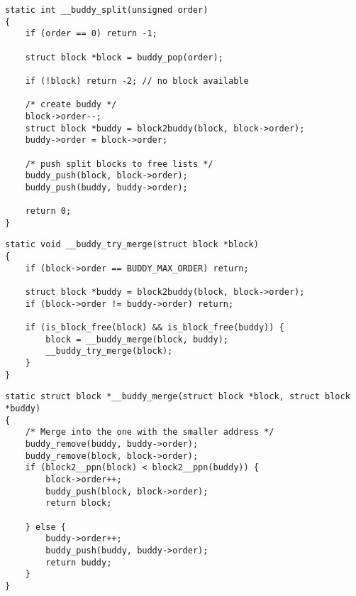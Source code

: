\newpar{}
\begin{lstlisting}[style=bright_C++]
static int __buddy_split(unsigned order)
{
    if (order == 0) return -1;

    struct block *block = buddy_pop(order);

    if (!block) return -2; // no block available

    /* create buddy */
    block->order--;
    struct block *buddy = block2buddy(block, block->order);
    buddy->order = block->order;

    /* push split blocks to free lists */
    buddy_push(block, block->order);
    buddy_push(buddy, buddy->order);

    return 0;
}
\end{lstlisting}

\newpar{}
\begin{lstlisting}[style=bright_C++]
static void __buddy_try_merge(struct block *block)
{
    if (block->order == BUDDY_MAX_ORDER) return;

    struct block *buddy = block2buddy(block, block->order);
    if (block->order != buddy->order) return;

    if (is_block_free(block) && is_block_free(buddy)) {
        block = __buddy_merge(block, buddy);
        __buddy_try_merge(block);
    }
}
\end{lstlisting}
\newpar{}
\begin{lstlisting}[style=bright_C++]
static struct block *__buddy_merge(struct block *block, struct block *buddy)
{
    /* Merge into the one with the smaller address */
    buddy_remove(buddy, buddy->order);
    buddy_remove(block, block->order);
    if (block2__ppn(block) < block2__ppn(buddy)) {
        block->order++;
        buddy_push(block, block->order);
        return block;

    } else {
        buddy->order++;
        buddy_push(buddy, buddy->order);
        return buddy;
    }
}
\end{lstlisting}

